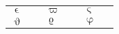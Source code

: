 \documentclass{article}
\newcommand*\s[1]{$#1$&\texttt{\string#1}}
\begin{document}
\begin{tabular}{l@{~}ll@{~}ll@{~}l}
\s\upvarepsilon & \s\upvarpi      & \s\upvarsigma  \\
\s\upvartheta   &  \s\upvarrho  & \s\upvarphi
\end{tabular}
\end{document}
